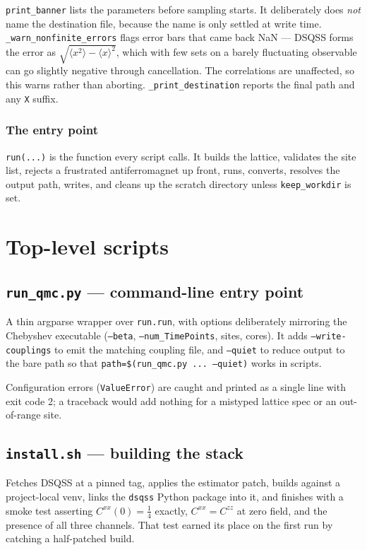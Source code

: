 \documentclass[11pt,a4paper]{article}
\newcommand{\code}[1]{\texttt{#1}}
\newcommand{\file}[1]{\texttt{\textbf{#1}}}
\begin{document}
\code{print\_banner} lists the parameters before sampling starts. It
deliberately does \emph{not} name the destination file, because the name is only
settled at write time. \code{\_warn\_nonfinite\_errors} flags error bars that
came back NaN --- DSQSS forms the error as
$\sqrt{\langle x^2\rangle - \langle x\rangle^2}$, which with few sets on a barely
fluctuating observable can go slightly negative through cancellation. The
correlations are unaffected, so this warns rather than aborting.
\code{\_print\_destination} reports the final path and any \code{X} suffix.

\subsubsection*{The entry point}

\code{run(...)} is the function every script calls. It builds the lattice,
validates the site list, rejects a frustrated antiferromagnet up front, runs,
converts, resolves the output path, writes, and cleans up the scratch directory
unless \code{keep\_workdir} is set.

\section{Top-level scripts}

\subsection{\file{run\_qmc.py} --- command-line entry point}

A thin argparse wrapper over \code{run.run}, with options deliberately mirroring
the Chebyshev executable (\code{--beta}, \code{--num\_TimePoints}, sites,
cores). It adds \code{--write-couplings} to emit the matching coupling file, and
\code{--quiet} to reduce output to the bare path so that
\code{path=\$(run\_qmc.py ... --quiet)} works in scripts.

Configuration errors (\code{ValueError}) are caught and printed as a single line
with exit code 2; a traceback would add nothing for a mistyped lattice spec or
an out-of-range site.

\subsection{\file{install.sh} --- building the stack}

Fetches DSQSS at a pinned tag, applies the estimator patch, builds against a
project-local venv, links the \code{dsqss} Python package into it, and finishes
with a smoke test asserting $C^{xx}(0)=\tfrac14$ exactly, $C^{xx}=C^{zz}$ at
zero field, and the presence of all three channels. That test earned its place
on the first run by catching a half-patched build.
\end{document}
